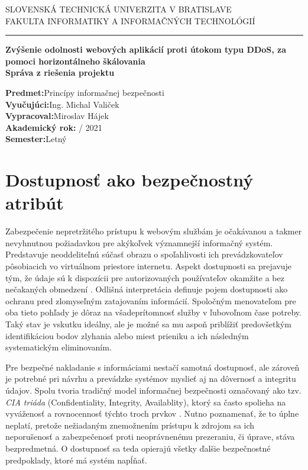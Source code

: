 \documentclass[12pt, a4paper]{article}
\begin{document}
\begin{titlepage}
    \hspace{0pt}
    \centering
    \large SLOVENSKÁ TECHNICKÁ UNIVERZITA V BRATISLAVE \\
    \large FAKULTA INFORMATIKY A INFORMAČNÝCH TECHNOLÓGIÍ
    \noindent\rule{\textwidth}{1pt}
    \vfill
    \Large \textbf{Zvýšenie odolnosti webových aplikácií proti útokom typu DDoS, za pomoci horizontálneho  škálovania}\\
    \vspace{1cm}
    \large \textbf{Správa z riešenia projektu}
    \vfill
    \normalsize
    \begin{flushleft}
    \textbf{Predmet:}\quad Princípy informačnej bezpečnosti \\
    \textbf{Vyučujúci:}\quad Ing. Michal Valiček \\
    \textbf{Vypracoval:}\quad Miroslav Hájek \\
	\textbf{Akademický rok:} / 2021 \\
	\textbf{Semester:}\quad Letný
	\end{flushleft}
\end{titlepage}


\tableofcontents
\newpage
{}
\setcounter{page}{1}

\section{Dostupnosť ako bezpečnostný atribút}
Zabezpečenie nepretržitého prístupu k webovým službám je očakávanou a takmer nevyhnutnou požiadavkou pre 
akýkoľvek významnejší informačný systém. Predstavuje neoddeliteľnú súčasť obrazu o spoľahlivosti 
ich prevádzkovateľov pôsobiacich vo virtuálnom priestore internetu. Aspekt dostupnosti sa prejavuje tým,
že údaje sú k dispozícii pre autorizovaných používateľov okamžite a bez nečakaných obmedzení   
 \cite{availability}. Odlišná interpretácia definuje pojem dostupnosti ako ochranu pred zlomyseľným 
zatajovaním informácií. Spoločným menovateľom pre oba tieto pohľady je dôraz na všadeprítomnosť služby v 
ľubovoľnom čase potreby. Taký stav je vskutku ideálny, ale je možné sa mu aspoň priblížiť predovšetkým 
identifikáciou bodov zlyhania alebo miest prieniku a ich následným systematickým eliminovaním.

Pre bezpečné nakladanie s informáciami nestačí samotná dostupnosť, ale zároveň je potrebné pri návrhu a 
prevádzke systémov myslieť aj na dôvernosť a integritu údajov. Spolu tvoria tradičný model informačnej 
bezpečnosti označovaný ako tzv. \emph{CIA triáda} (Confidentiality, Integrity, Availablity), ktorý sa často 
spolieha na vyváženosť a rovnocennosť týchto troch prvkov \cite{availability}. Nutno poznamenať, 
že to úplne neplatí, pretože nežiadaným znemožnením prístupu k zdrojom sa ich neporušenosť a zabezpečenosť 
proti neoprávnenému prezeraniu, či úprave, stáva bezpredmetná. O dostupnosť sa teda opierajú všetky ďalšie
bezpečnostné predpoklady, ktoré má systém napĺňať.
\end{document}
